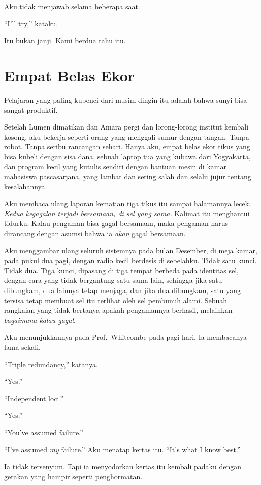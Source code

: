 \documentclass[11pt,twoside,openany]{book}
\begin{document}
Aku tidak menjawab selama beberapa saat.

``I'll try,'' kataku.

Itu bukan janji. Kami berdua tahu itu.

\chapter{Empat Belas Ekor}
Pelajaran yang paling kubenci dari musim dingin itu adalah bahwa sunyi bisa sangat produktif.

Setelah Lumen dimatikan dan Amara pergi dan lorong-lorong institut kembali kosong, aku bekerja seperti orang yang menggali sumur dengan tangan. Tanpa robot. Tanpa seribu rancangan sehari. Hanya aku, empat belas ekor tikus yang bisa kubeli dengan sisa dana, sebuah laptop tua yang kubawa dari Yogyakarta, dan program kecil yang kutulis sendiri dengan bantuan mesin di kamar mahasiswa pascasarjana, yang lambat dan sering salah dan selalu jujur tentang kesalahannya.

Aku membaca ulang laporan kematian tiga tikus itu sampai halamannya lecek. \emph{Kedua kegagalan terjadi bersamaan, di sel yang sama.} Kalimat itu menghantui tidurku. Kalau pengaman bisa gagal bersamaan, maka pengaman harus dirancang dengan asumsi bahwa ia \emph{akan} gagal bersamaan.

Aku menggambar ulang seluruh sistemnya pada bulan Desember, di meja kamar, pada pukul dua pagi, dengan radio kecil berdesis di sebelahku. Tidak satu kunci. Tidak dua. Tiga kunci, dipasang di tiga tempat berbeda pada identitas sel, dengan cara yang tidak bergantung satu sama lain, sehingga jika satu dibungkam, dua lainnya tetap menjaga, dan jika dua dibungkam, satu yang tersisa tetap membuat sel itu terlihat oleh sel pembunuh alami. Sebuah rangkaian yang tidak bertanya apakah pengamannya berhasil, melainkan \emph{bagaimana kalau gagal}.

Aku menunjukkannya pada Prof.~Whitcombe pada pagi hari. Ia membacanya lama sekali.

``Triple redundancy,'' katanya.

``Yes.''

``Independent loci.''

``Yes.''

``You've assumed failure.''

``I've assumed \emph{my} failure.'' Aku menatap kertas itu. ``It's what I know best.''

Ia tidak tersenyum. Tapi ia menyodorkan kertas itu kembali padaku dengan gerakan yang hampir seperti penghormatan.
\end{document}
